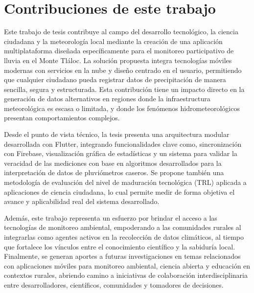 \section{Contribuciones de este trabajo}

Este trabajo de tesis contribuye al campo del desarrollo tecnológico, la ciencia ciudadana y la meteorología local mediante la creación de una aplicación multiplataforma diseñada específicamente para el monitoreo participativo de lluvia en el Monte Tláloc. La solución propuesta integra tecnologías móviles modernas con servicios en la nube y diseño centrado en el usuario, permitiendo que cualquier ciudadano pueda registrar datos de precipitación de manera sencilla, segura y estructurada. Esta contribución tiene un impacto directo en la generación de datos alternativos en regiones donde la infraestructura meteorológica es escasa o limitada, y donde los fenómenos hidrometeorológicos presentan comportamientos complejos.

Desde el punto de vista técnico, la tesis presenta una arquitectura modular desarrollada con Flutter, integrando funcionalidades clave como, sincronización con Firebase, visualización gráfica de estadísticas y un sistema para validar la veracidad de las mediciones con base en algoritmos desarrollados para la interpretación de datos de pluviómetros caseros. Se propone también una metodología de evaluación del nivel de maduración tecnológica (TRL) aplicada a aplicaciones de ciencia ciudadana, lo cual permite medir de forma objetiva el avance y aplicabilidad real del sistema desarrollado.

Además, este trabajo representa un esfuerzo por brindar el acceso a las tecnologías de monitoreo ambiental, empoderando a las comunidades rurales al integrarlas como agentes activos en la recolección de datos climáticos, al tiempo que fortalece los vínculos entre el conocimiento científico y la sabiduría local. Finalmente, se generan aportes a futuras investigaciones en temas relacionados con aplicaciones móviles para monitoreo ambiental, ciencia abierta y educación en contextos rurales, abriendo camino a iniciativas de colaboración interdisciplinaria entre desarrolladores, científicos, comunidades y tomadores de decisiones.


